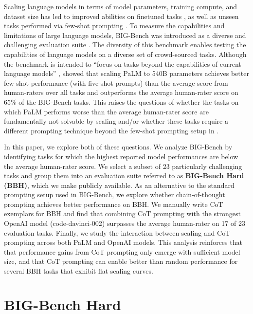 Scaling language models in terms of model parameters, training compute, and dataset size has led to improved abilities on finetuned tasks \citep[][\textit{inter alia}]{devlin-etal-2019-bert,raffel2020exploring}, as well as unseen tasks performed via few-shot prompting \citep[][\textit{inter alia}]{brown2020language}. To measure the capabilities and limitations of large language models, BIG-Bench was introduced as a diverse and challenging evaluation suite \citep{srivastava2022beyond}. The diversity of this benchmark enables testing the capabilities of language models on a diverse set of crowd-sourced tasks. Although the benchmark is intended to ``focus on tasks beyond the capabilities of current language models'' \citep{srivastava2022beyond}, \citet{chowdhery2022palm} showed that scaling PaLM to 540B parameters achieves better few-shot performance (with five-shot prompts) than the average score from human-raters over all tasks and outperforms the average human-rater score on 65\% of the BIG-Bench tasks. This raises the questions of whether the tasks on which PaLM performs worse than the average human-rater score are fundamentally not solvable by scaling and/or whether these tasks require a different prompting technique beyond the few-shot prompting setup in \citet{srivastava2022beyond}.

In this paper, we explore both of these questions. We analyze BIG-Bench by identifying tasks for which the highest reported model performances are below the average human-rater score. We select a subset of 23 particularly challenging tasks and group them into an evaluation suite referred to as \textbf{BIG-Bench Hard (BBH)}, which we make publicly available. As an alternative to the standard prompting setup used in BIG-Bench, we explore whether chain-of-thought prompting \citep[CoT;][]{wei2022chain} achieves better performance on BBH. We manually write CoT exemplars for BBH and find that combining CoT prompting with the strongest OpenAI model (code-davinci-002) surpasses the average human-rater on 17 of 23 evaluation tasks. Finally, we study the interaction between scaling and CoT prompting across both PaLM and OpenAI models. This analysis reinforces that that performance gains from CoT prompting only emerge with sufficient model size, and that CoT prompting can enable better than random performance for several BBH tasks that exhibit flat scaling curves.

\section{BIG-Bench Hard}
\label{sec:bigbench}

